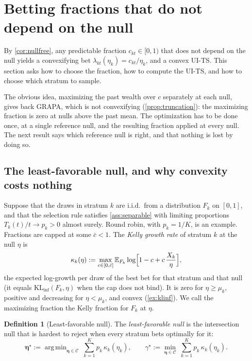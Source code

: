 \documentclass[11pt]{article}
\newcommand{\bs}{\boldsymbol}
\newcommand{\E}{\mathbb{E}}
\newcommand{\calC}{\mathcal{C}}
\newcommand{\KLinf}{\mathrm{KL}_{\inf}}
\newcommand{\cbar}{\bar c}
\DeclareMathOperator*{\argmin}{arg\,min}
\theoremstyle{plain}
\theoremstyle{definition}
\newtheorem{definition}[theorem]{Definition}
\theoremstyle{remark}
\begin{document}
\section{Betting fractions that do not depend on the null}\label{sec:fractions}

By \cref{cor:nullfree}, any predictable fraction $c_{kt}\in[0,1)$ that does not depend on the null yields a
convexifying bet $\lambda_{kt}(\eta_k)=c_{kt}/\eta_k$, and a convex UI-TS.  This section asks how to choose the fraction,
how to compute the UI-TS, and how to choose which stratum to sample.

The obvious idea, maximizing the past wealth over $c$ separately at each null, gives back GRAPA, which is not
convexifying (\cref{prop:truncation}): the maximizing fraction is zero at nulls above the past mean.  The
optimization has to be done once, at a single reference null, and the resulting fraction applied at every null.  The
next result says which reference null is right, and that nothing is lost by doing so.

\subsection{The least-favorable null, and why convexity costs nothing}\label{sec:nocost}

Suppose that the draws in stratum $k$ are i.i.d.\ from a distribution $F_k$ on $[0,1]$, and that the selection rule
satisfies \cref{ass:separable} with limiting proportions $T_k(t)/t\to p_k>0$ almost surely.  Round robin, with
$p_k=1/K$, is an example.  Fractions are capped at some $\cbar<1$.  The \emph{Kelly growth rate} of stratum $k$ at the
null $\eta$ is
\[
\kappa_k(\eta) := \max_{c\in[0,\cbar]}\E_{F_k}\log\Bigl[1-c+c\,\frac{X_k}{\eta}\Bigr],
\]
the expected log-growth per draw of the best bet for that stratum and that null (it equals $\KLinf(F_k,\eta)$ when the
cap does not bind).  It is zero for $\eta\ge\mu_k$, positive and decreasing for $\eta<\mu_k$, and convex
(\cref{ex:klinf}).  We call the maximizing fraction the Kelly fraction for $F_k$ at $\eta$.

\begin{definition}[Least-favorable null]\label{def:lfn}
The \emph{least-favorable null} is the intersection null that is hardest to reject when every stratum bets optimally
for it:
\[
\bs\eta^\star := \argmin_{\bs\eta\in\calC}\;\sum_{k=1}^K p_k\,\kappa_k(\eta_k),
\qquad
\gamma^\star := \min_{\bs\eta\in\calC}\;\sum_{k=1}^K p_k\,\kappa_k(\eta_k).
\]
\end{definition}
\end{document}
